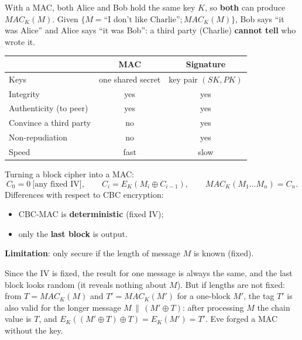 \begin{defnbox}[title=Repudiation]
With a MAC, both Alice and Bob hold the same key $K$, so \textbf{both} can produce
$MAC_K(M)$. Given $\{M = \text{``I don't like Charlie''}; MAC_K(M)\}$, Bob says ``it was
Alice'' and Alice says ``it was Bob'': a third party (Charlie) \textbf{cannot tell} who
wrote it.
\end{defnbox}

\begin{keybox}[title=MAC vs.\ digital signature]
\begin{center}
\begin{tabular}{l|c|c}
                         & \textbf{MAC}       & \textbf{Signature}  \\ \hline
Keys                     & one shared secret  & key pair $(SK, PK)$ \\
Integrity                & yes                & yes                 \\
Authenticity (to peer)   & yes                & yes                 \\
Convince a third party   & no                 & yes                 \\
Non-repudiation          & no                 & yes                 \\
Speed                    & fast               & slow
\end{tabular}
\end{center}
\end{keybox}

\begin{defnbox}[title=CBC-MAC]
Turning a block cipher into a MAC:
\[
  C_0 = 0 \ \text{[any fixed IV]}, \qquad C_i = E_K(M_i \oplus C_{i-1}), \qquad
  MAC_K(M_1 \ldots M_n) = C_n .
\]
Differences with respect to CBC encryption:
\begin{itemize}
  \item CBC-MAC is \textbf{deterministic} (fixed IV);
  \item only the \textbf{last block} is output.
\end{itemize}
\textbf{Limitation}: only secure if the length of message $M$ is known (fixed).
\end{defnbox}

\begin{exbox}[title={Why fixed length: the extension attack}]
Since the IV is fixed, the result for one message is always the same, and the last block looks
random (it reveals nothing about $M$). But if lengths are not fixed: from $T = MAC_K(M)$ and $T' =
MAC_K(M')$ for a one-block $M'$, the tag $T'$ is also valid for the longer message $M \,\|\, (M'
\oplus T)$: after processing $M$ the chain value is $T$, and $E_K((M' \oplus T) \oplus T) =
E_K(M') = T'$. Eve forged a MAC without the key.
\end{exbox}

